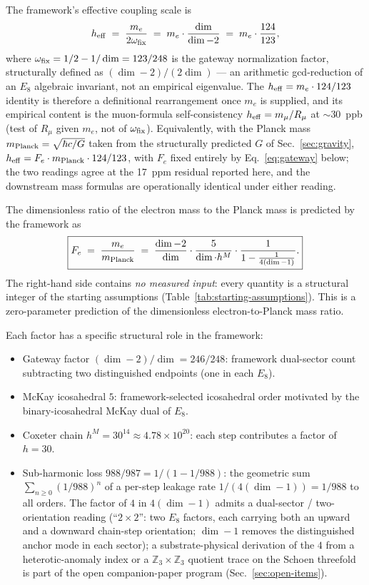 ﻿\documentclass[reprint,amsmath,amssymb,aps,prd,longbibliography,floatfix]{revtex4-2}
\begin{document}
The framework's effective coupling scale is
\begin{equation}
h_{\rm eff} \;=\; \frac{m_e}{2 \omega_{\rm fix}}
            \;=\; m_e \cdot \frac{\dim}{\dim - 2}
            \;=\; m_e \cdot \frac{124}{123},
\end{equation}
where $\omega_{\rm fix} = 1/2 - 1/\dim = 123/248$ is the gateway
normalization factor, structurally defined as $(\dim - 2)/(2\dim)$
--- an arithmetic gcd-reduction of an $E_8$ algebraic invariant, not
an empirical eigenvalue. The $h_{\rm eff} = m_e \cdot 124/123$
identity is therefore a definitional rearrangement once $m_e$ is
supplied, and its empirical content is the muon-formula
self-consistency
$h_{\rm eff} = m_\mu / R_\mu$ at $\sim 30$~ppb (test of $R_\mu$
given $m_e$, not of $\omega_{\rm fix}$). Equivalently, with the
Planck mass
$m_{\rm Planck} = \sqrt{\hbar c / G}$ taken from the structurally
predicted $G$ of Sec.~\ref{sec:gravity},
$h_{\rm eff} = F_e \cdot m_{\rm Planck} \cdot 124/123$, with $F_e$
fixed entirely by Eq.~\eqref{eq:gateway} below; the two readings
agree at the \SI{17}{ppm} residual reported here, and the downstream
mass formulas are operationally identical under either reading.

The dimensionless ratio of the electron mass to the Planck mass is
predicted by the framework as
\begin{equation}
\boxed{
F_e \;=\; \frac{m_e}{m_{\rm Planck}}
    \;=\; \frac{\dim - 2}{\dim} \cdot \frac{5}{\dim \cdot h^M}
      \cdot \frac{1}{1 - \frac{1}{4(\dim - 1)}}.
}
\label{eq:gateway}
\end{equation}
The right-hand side contains \emph{no measured input}: every quantity
is a structural integer of the starting assumptions
(Table~\ref{tab:starting-assumptions}). This is a zero-parameter
prediction of the dimensionless electron-to-Planck mass ratio.

Each factor has a specific structural role in the framework:
\begin{itemize}
\item Gateway factor $(\dim - 2)/\dim = 246/248$: framework
dual-sector count subtracting two distinguished endpoints (one in each
$E_8$).
\item McKay icosahedral $5$: framework-selected icosahedral order
motivated by the binary-icosahedral McKay dual of $E_8$.
\item Coxeter chain $h^M = 30^{14} \approx 4.78 \times 10^{20}$:
each step contributes a factor of $h = 30$.
\item Sub-harmonic loss $988/987 = 1/(1 - 1/988)$: the geometric
sum $\sum_{n \geq 0} (1/988)^n$ of a per-step leakage rate
$1/(4(\dim - 1)) = 1/988$ to all orders. The factor of $4$ in
$4(\dim - 1)$ admits a dual-sector / two-orientation reading
(``$2 \times 2$'': two $E_8$ factors, each carrying both an upward
and a downward chain-step orientation; $\dim - 1$ removes the
distinguished anchor mode in each sector); a substrate-physical
derivation of the $4$ from a heterotic-anomaly index or a
$\mathbb{Z}_3 \times \mathbb{Z}_3$ quotient trace on the Schoen
threefold is part of the open companion-paper program
(Sec.~\ref{sec:open-items}).
\end{itemize}
\end{document}
